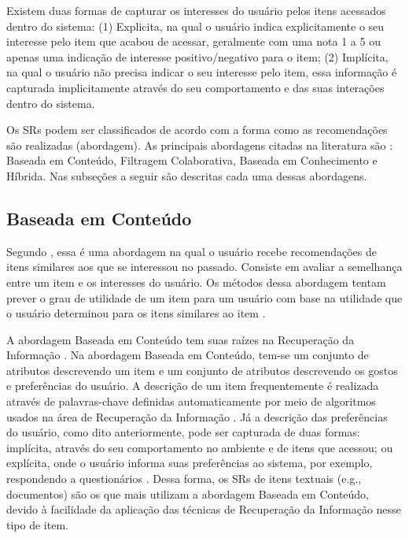 Existem duas formas de capturar os interesses do usuário pelos itens acessados dentro do sistema: (1) Explicita, na
qual o usuário indica explicitamente o seu interesse pelo item que acabou de acessar, geralmente com uma nota 1 a 5 ou
apenas uma indicação de interesse positivo/negativo para o item; (2) Implícita, na qual o usuário não precisa indicar o
seu interesse pelo item, essa informação é capturada implicitamente através do seu comportamento e das suas interações
dentro do sistema.

Os SRs podem ser classificados de acordo com a forma como as recomendações são realizadas (abordagem). As principais
abordagens citadas na literatura são \cite{torres2004personalizaccao, adomavicius2005toward, ricci2011introduction, bobadilla2013recommender}:
Baseada em Conteúdo, Filtragem Colaborativa, Baseada em Conhecimento e Híbrida. Nas subseções a seguir são descritas
cada uma dessas abordagens.

\subsection{Baseada em Conteúdo}\label{subsection:baseada-em-conteudo}

Segundo , essa é uma abordagem na qual o usuário recebe recomendações de itens
similares aos que se interessou no passado. Consiste em avaliar a semelhança entre um item e os interesses do usuário.
Os métodos dessa abordagem tentam prever o grau de utilidade de um item para um usuário com base na utilidade que o
usuário determinou para os itens similares ao item \cite{adomavicius2005toward}.

A abordagem Baseada em Conteúdo tem suas raízes na Recuperação da Informação \cite{adomavicius2005toward}. Na
abordagem Baseada em Conteúdo, tem-se um conjunto de atributos descrevendo um item e um conjunto de atributos
descrevendo os gostos e preferências do usuário. A descrição de um item frequentemente é realizada através de
palavras-chave definidas automaticamente por meio de algoritmos usados na área de Recuperação da Informação
\cite{adomavicius2005toward}. Já a descrição das preferências do usuário, como dito anteriormente, pode ser capturada de duas formas: implícita,
através do seu comportamento no ambiente e de itens que acessou; ou explícita, onde o usuário informa suas preferências
ao sistema, por exemplo, respondendo a questionários \cite{adomavicius2005toward}. Dessa forma, os SRs de itens
textuais (e.g., documentos) são os que mais utilizam a abordagem Baseada em Conteúdo, devido à facilidade da aplicação
das técnicas de Recuperação da Informação nesse tipo de item.


